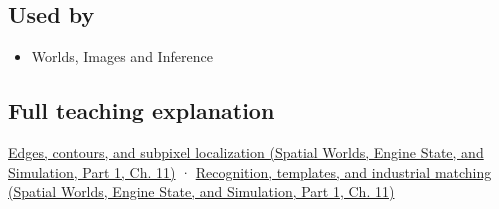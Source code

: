 \subsection{Used by}\label{appendix-a5b0383b3b3e-used-by}

\hypertarget{appendix-a5b0383b3b3e-used-by}{}

\begin{itemize}
\tightlist
\item
  {Worlds, Images and Inference}
\end{itemize}

\subsection{Full teaching explanation}\label{appendix-a5b0383b3b3e-full-teaching-explanation}

\hypertarget{appendix-a5b0383b3b3e-full-teaching-explanation}{}

\href{../05-Spatial-Worlds-Engine-State-and-Simulation-P01/main.pdf\#04-visual-computing-ii-ch030-edges-contours-and-subpixel-localization}{Edges, contours, and subpixel localization (Spatial Worlds, Engine State, and Simulation, Part 1, Ch. 11)} · \href{../05-Spatial-Worlds-Engine-State-and-Simulation-P01/main.pdf\#04-visual-computing-ii-ch030-recognition-templates-and-industrial-matching}{Recognition, templates, and industrial matching (Spatial Worlds, Engine State, and Simulation, Part 1, Ch. 11)}
